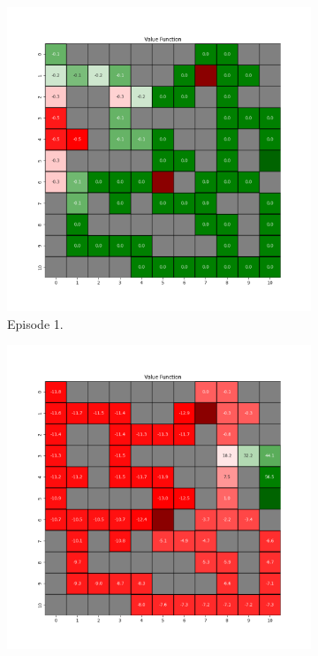 \documentclass{assignment}
\begin{document}
\begin{figure}[H]
    \begin{subfigure}{0.3\textwidth}
        \includegraphics[width=\textwidth]{figures/value_q/epsilon_sweep/value_function_alpha_0.1_gamma_0.95_epsilon_0.0_iteration_1.png}
    \caption{Episode 1.}
    \end{subfigure}\hfill
    \begin{subfigure}{0.3\textwidth}
        \includegraphics[width=\textwidth]{figures/value_q/epsilon_sweep/value_function_alpha_0.1_gamma_0.95_epsilon_0.0_iteration_50.png}

\end{subfigure}
\end{figure}
\end{document}
